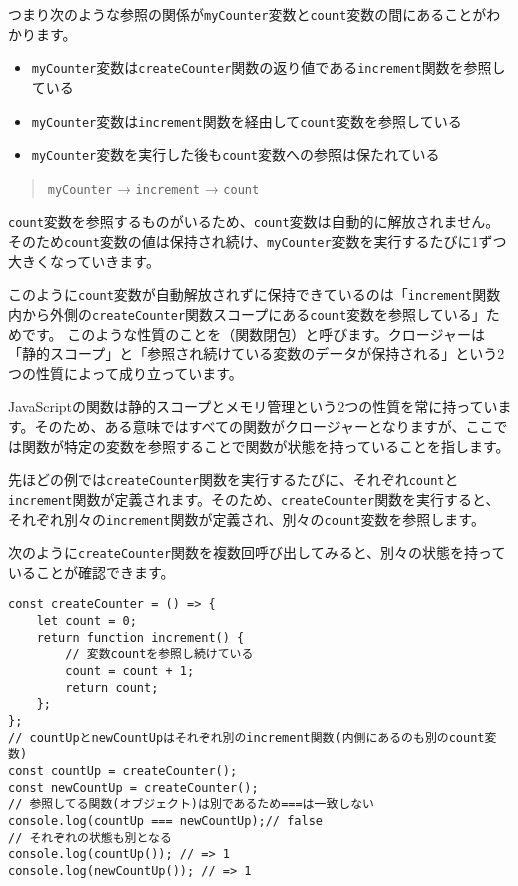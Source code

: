 つまり次のような参照の関係が\texttt{myCounter}変数と\texttt{count}変数の間にあることがわかります。

\begin{itemize}
\item
  \texttt{myCounter}変数は\texttt{createCounter}関数の返り値である\texttt{increment}関数を参照している
\item
  \texttt{myCounter}変数は\texttt{increment}関数を経由して\texttt{count}変数を参照している
\item
  \texttt{myCounter}変数を実行した後も\texttt{count}変数への参照は保たれている
\end{itemize}

\begin{quote}
\texttt{myCounter} → \texttt{increment} → \texttt{count}
\end{quote}

\texttt{count}変数を参照するものがいるため、\texttt{count}変数は自動的に解放されません。
そのため\texttt{count}変数の値は保持され続け、\texttt{myCounter}変数を実行するたびに1ずつ大きくなっていきます。

このように\texttt{count}変数が自動解放されずに保持できているのは「\texttt{increment}関数内から外側の\texttt{createCounter}関数スコープにある\texttt{count}変数を参照している」ためです。
このような性質のことを\textbf{}（関数閉包）と呼びます。クロージャーは「静的スコープ」と「参照され続けている変数のデータが保持される」という2つの性質によって成り立っています。

JavaScriptの関数は静的スコープとメモリ管理という2つの性質を常に持っています。そのため、ある意味ではすべての関数がクロージャーとなりますが、ここでは関数が特定の変数を参照することで関数が状態を持っていることを指します。

先ほどの例では\texttt{createCounter}関数を実行するたびに、それぞれ\texttt{count}と\texttt{increment}関数が定義されます。そのため、\texttt{createCounter}関数を実行すると、それぞれ別々の\texttt{increment}関数が定義され、別々の\texttt{count}変数を参照します。

次のように\texttt{createCounter}関数を複数回呼び出してみると、別々の状態を持っていることが確認できます。

\begin{lstlisting}
const createCounter = () => {
    let count = 0;
    return function increment() {
        // 変数countを参照し続けている
        count = count + 1;
        return count;
    };
};
// countUpとnewCountUpはそれぞれ別のincrement関数(内側にあるのも別のcount変数)
const countUp = createCounter();
const newCountUp = createCounter();
// 参照してる関数(オブジェクト)は別であるため===は一致しない
console.log(countUp === newCountUp);// false
// それぞれの状態も別となる
console.log(countUp()); // => 1
console.log(newCountUp()); // => 1
\end{lstlisting}

